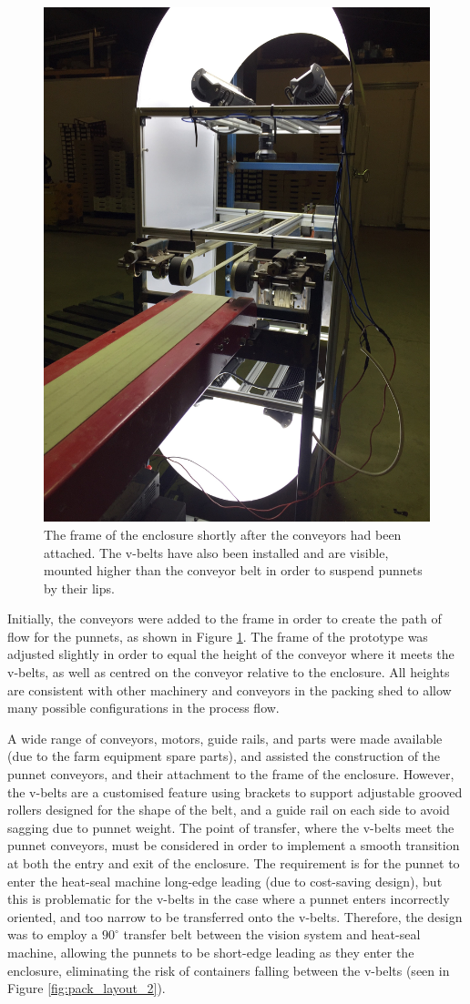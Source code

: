 \documentclass[fleqn,twoside,12pt]{report}
\begin{document}
\begin{figure}[h]
	\centering
	\includegraphics[width=.65\linewidth, angle=270]{system_construct_2_2.jpg}
	\caption{The frame of the enclosure shortly after the conveyors had been attached. The v-belts have also been installed and are visible, mounted higher than the conveyor belt in order to suspend punnets by their lips.}
	\label{fig:system_construct_3}
\end{figure}%

Initially, the conveyors were added to the frame in order to create the path of flow for the punnets, as shown in Figure \ref{fig:system_construct_3}. The frame of the prototype was adjusted slightly in order to equal the height of the conveyor where it meets the v-belts, as well as centred on the conveyor relative to the enclosure. All heights are consistent with other machinery and conveyors in the packing shed to allow many possible configurations in the process flow. 


A wide range of conveyors, motors, guide rails, and parts were made available (due to the farm equipment spare parts), and assisted the construction of the punnet conveyors, and their attachment to the frame of the enclosure. However, the v-belts are a customised feature using brackets to support adjustable grooved rollers designed for the shape of the belt, and a guide rail on each side to avoid sagging due to punnet weight. The point of transfer, where the v-belts meet the punnet conveyors, must be considered in order to implement a smooth transition at both the entry and exit of the enclosure. The requirement is for the punnet to enter the heat-seal machine long-edge leading (due to cost-saving design), but this is problematic for the v-belts in the case where a  punnet enters incorrectly oriented, and too narrow to be transferred onto the v-belts. Therefore, the design was to employ a $90^{\circ}$ transfer belt between the vision system and heat-seal machine, allowing the punnets to be short-edge leading as they enter the enclosure, eliminating the risk of containers falling between the v-belts (seen in Figure \ref{fig:pack_layout_2}). 
\end{document}
